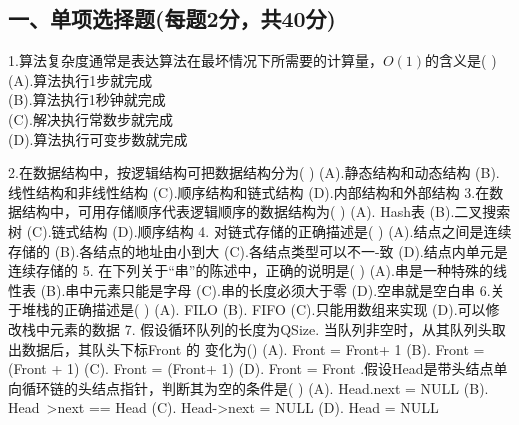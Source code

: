 
\subsection{一、单项选择题(每题2分，共40分)}

1.算法复杂度通常是表达算法在最坏情况下所需要的计算量，$O(1)$的含义是( ) \\
(A).算法执行1步就完成 \\
(B).算法执行1秒钟就完成 \\
(C).解决执行常数步就完成 \\
(D).算法执行可变步数就完成

2.在数据结构中，按逻辑结构可把数据结构分为( )
(A).静态结构和动态结构
(B).线性结构和非线性结构
(C).顺序结构和链式结构
(D).内部结构和外部结构
3.在数据结构中，可用存储顺序代表逻辑顺序的数据结构为( )
(A). Hash表
(B).二叉搜索树
(C).链式结构
(D).顺序结构
4. 对链式存储的正确描述是( )
(A).结点之间是连续存储的
(B).各结点的地址由小到大
(C).各结点类型可以不一-致
(D).结点内单元是连续存储的
5. 在下列关于“串”的陈述中，正确的说明是( )
(A).串是一种特殊的线性表
(B).串中元素只能是字母
(C).串的长度必须大于零
(D).空串就是空白串
6.关于堆栈的正确描述是( )
(A). FILO
(B). FIFO
(C).只能用数组来实现
(D).可以修改栈中元素的数据
7. 假设循环队列的长度为QSize. 当队列非空时，从其队列头取出数据后，其队头下标Front 的
变化为()
(A). Front = Front+ 1
(B). Front = (Front + 1) %
(C). Front = (Front+ 1) %
(D). Front = Front %
.假设Head是带头结点单向循环链的头结点指针，判断其为空的条件是( )
(A). Head.next = NULL
(B). Head~>next == Head
(C). Head->next = NULL
(D). Head = NULL
